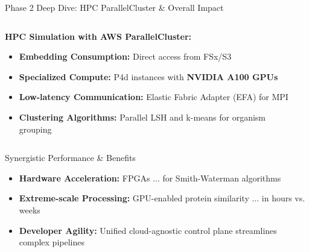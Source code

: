 \documentclass[aspectratio=169]{beamer}
\begin{document}
\begin{frame}{Phase 2 Deep Dive: HPC ParallelCluster \& Overall Impact}
    \begin{columns}
        \begin{column}{0.6\textwidth}
            \textbf{HPC Simulation with AWS ParallelCluster:}
            \begin{itemize}
                \item \textbf{Embedding Consumption:} Direct access from FSx/S3
                \item \textbf{Specialized Compute:} P4d instances with \textcolor{awsorange}{\textbf{NVIDIA A100 GPUs}}
                \item \textbf{Low-latency Communication:} Elastic Fabric Adapter (EFA) for MPI
                \item \textbf{Clustering Algorithms:} Parallel LSH and k-means for organism grouping
            \end{itemize}
        \end{column}
        \begin{column}{0.4\textwidth}
        \end{column}
    \end{columns}
    
    \vspace{0.3cm}
    \begin{block}{Synergistic Performance \& Benefits}
        \begin{itemize}
            \item \textbf{Hardware Acceleration:} FPGAs ... for Smith-Waterman algorithms
            \item \textbf{Extreme-scale Processing:} GPU-enabled protein similarity ... in hours vs. weeks
            \item \textbf{Developer Agility:} Unified cloud-agnostic control plane streamlines complex pipelines
        \end{itemize}
    \end{block}
\end{frame}
\end{document}
